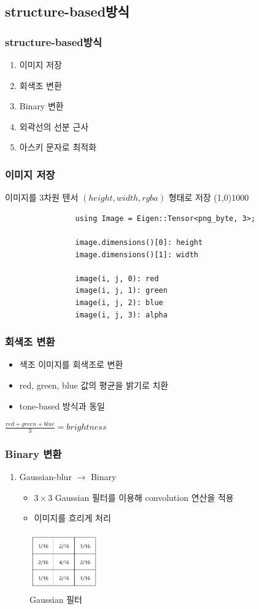 \documentclass{beamer}
\newcommand{\spacing}{\hspace{0.3em}}
\newcommand{\structurebased}{\textbf{structure-based}}
\begin{document}
	\subsection{\structurebased \spacing 방식}
	\begin{frame}{}
		\frametitle{\structurebased \spacing 방식}
		\begin{enumerate}
			\item 이미지 저장
			\item 회색조 변환
			\item Binary 변환
			\item 외곽선의 선분 근사
			\item 아스키 문자로 최적화
		\end{enumerate}
	\end{frame}
	\begin{frame}[fragile]
		\frametitle{이미지 저장}
			이미지를 3차원 텐서 $ ( height, width, rgba ) $ 형태로 저장
			\line(1,0){1000}
			\begin{verbatim}
				using Image = Eigen::Tensor<png_byte, 3>;
				
				image.dimensions()[0]: height
				image.dimensions()[1]: width

				image(i, j, 0): red
				image(i, j, 1): green
				image(i, j, 2): blue
				image(i, j, 3): alpha
			\end{verbatim}
	\end{frame}
	\begin{frame}{}
		\frametitle{회색조 변환}
		\begin{itemize}
			\item 색조 이미지를 회색조로 변환
			\item red, green, blue 값의 평균을 밝기로 치환
			\item tone-based 방식과 동일
		\end{itemize}
		\vspace{2em}
		\centering
		$ \displaystyle \frac{red + green + blue}{3} = brightness $
	\end{frame}
	\begin{frame}{}
		\frametitle{Binary 변환}
		\begin{enumerate}
			\item Gaussian-blur $ \rightarrow $ Binary
			\begin{itemize}
				\item $ 3 \times 3 $ Gaussian 필터를 이용해 convolution 연산을 적용 \\
				\item 이미지를 흐리게 처리
			\end{itemize}
		\end{enumerate}
		\begin{figure}
			\centering
			\includegraphics[width=3cm, height=2.5cm]{GaussianFilter.png} \\
			\vspace{-0.5em}
			\tiny{Gaussian 필터}
		\end{figure}
	\end{frame}
\end{document}
